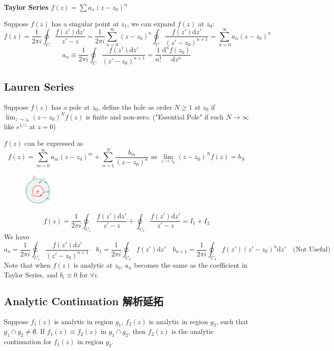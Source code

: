 \documentclass[10pt]{article}
\newcommand{\dd}{\mathrm{d}}
\begin{document}
\textbf{Taylor Series $f(z) = \sum a_n (z-z_0)^n$}

Suppose $f(z)$ has a singular point at $z_1$, we can expand $f(z)$ at $z_0$:
$$
f(z) = \frac{1}{2\pi i} \oint_C \frac{f(z')\dd z'}{z'-z} = \frac{1}{2\pi i} \sum_{n=0}^{\infty} (z-z_0)^n \oint_C \frac{f(z')\dd z'}{(z'-z_0)^{n+1}} = \sum_{n=0}^{\infty} a_n (z-z_0)^n
$$
$$
a_n \equiv \frac{1}{2\pi i} \oint_C \frac{f(z')\dd z'}{(z'-z_0)^{n+1}} = \frac{1}{n!} \frac{\dd^n f(z_0)}{\dd z^n}
$$

\subsection{Lauren Series}

Suppose $f(z)$ has a pole at $z_0$, define the hole as order $N \geq 1$ at $z_0$ if $\lim_{z\to z_0} (z-z_0)^N f(z)$ is finite and non-zero. ("Essential Pole" if such $N\to\infty$ like $e^{1/z}$ at $z=0$)

$f(z)$ can be expressed as
$$
f(z) = \sum_{m=0}^\infty a_m (z-z_0)^m + \sum_{n=1}^N \frac{b_m}{(z-z_0)^n} \text{ as } \lim_{z\to z_0} (z-z_0)^N f(z) = b_N
$$
\begin{figure}
	\centering
	\includegraphics[width=0.14\textwidth]{img3-2}
\end{figure}
$$
f(z) = \frac{1}{2\pi i} \oint_{C_1} \frac{f(z')\dd z'}{z'-z} + \oint_{C_2} \frac{f(z')\dd z'}{z'-z} = I_1 + I_2
$$
We have
$$
a_n = \frac{1}{2\pi i} \oint_{C_1} \frac{f(z')\dd z'}{(z'-z_0)^{n+1}} \quad b_1 = \frac{1}{2\pi i} \oint_{C_2} f(z')\dd z' \quad b_{n+1} = \frac{1}{2\pi i} \oint_{C_2} f(z')(z'-z_0)^n\dd z' \quad \text{(Not Useful)}
$$
Note that when $f(z)$ is analytic at $z_0$, $a_n$ becomes the same as the coefficient in Taylor Series, and $b_i \equiv 0$ for $\forall i$.

\subsection{Analytic Continuation 解析延拓}

Suppose $f_1(z)$ is analytic in region $g_1$, $f_2(z)$ is analytic in region $g_2$, such that $g_1 \cap g_2 \neq \emptyset$. If $f_1(z) \equiv f_2(z)$ in $g_1 \cap g_2$, then $f_2(z)$ is the analytic continuation for $f_1(z)$ in region $g_2$.
\end{document}
